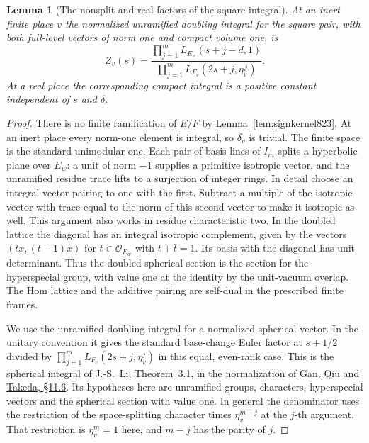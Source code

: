\documentclass[a4paper,11pt]{article}
\newtheorem{lemma}[proposition]{Lemma}
\theoremstyle{definition}
\theoremstyle{remark}
\numberwithin{equation}{section}
\begin{document}
\begin{lemma}[The nonsplit and real factors of the square integral]
\leavevmode\label{lem:squarespherical828}
At an inert finite place \(v\) the normalized unramified
doubling integral for the square pair, with both full-level
vectors of norm one and compact volume one, is
\[
 Z_v(s)=
 \frac{\displaystyle\prod_{j=1}^{m} L_{E_w}(s+j-d,1)}
      {\displaystyle\prod_{j=1}^{m} L_{F_v}(2s+j,\eta_v^{\,j})}.
\]
At a real place the corresponding compact integral is a
positive constant independent of \(s\) and \(\delta\).
\end{lemma}
\begin{proof}
There is no finite ramification of \(E/F\) by
Lemma~\ref{lem:signkernel823}. At an inert place every
norm-one element is integral, so \(\delta_v\) is trivial.
The finite space is the standard unimodular one. Each pair
of basis lines of \(I_m\) splits a hyperbolic plane over
\(E_w\): a unit of norm \(-1\) supplies a primitive isotropic
vector, and the unramified residue trace lifts to a surjection
of integer rings. In detail choose an integral vector pairing
to one with the first. Subtract a multiple of the isotropic
vector with trace equal to the norm of this second vector to
make it isotropic as well. This argument also works in residue
characteristic two. In the doubled lattice the diagonal has
an integral isotropic complement, given by the vectors
\((t x,(t-1)x)\) for \(t\in\mathcal O_{E_w}\) with
\(t+\bar t=1\). Its basis with the diagonal has unit determinant.
Thus the doubled spherical section is the section for the
hyperspecial group, with value one at the identity by the
unit-vacuum overlap. The Hom lattice and the additive pairing
are self-dual in the prescribed finite frames.

We use the unramified doubling integral for a normalized
spherical vector. In the unitary convention it gives the
standard base-change Euler factor at \(s+1/2\) divided by
\(\prod_{j=1}^m L_{F_v}(2s+j,\eta_v^j)\) in this equal,
even-rank case. This is the spherical integral of
\href{https://doi.org/10.1515/crll.1992.428.177}{J.-S.~Li,
Theorem~3.1}, in the normalization of
\href{https://arxiv.org/pdf/1207.4709}{Gan, Qiu and Takeda,
\S11.6}. Its hypotheses here are unramified groups, characters,
hyperspecial vectors and the spherical section with value one.
In general the denominator uses the restriction of the
space-splitting character times \(\eta_v^{m-j}\) at the
\(j\)-th argument. That restriction is \(\eta_v^m=1\)
here, and \(m-j\) has the parity of \(j\).


\end{proof}
\end{document}
